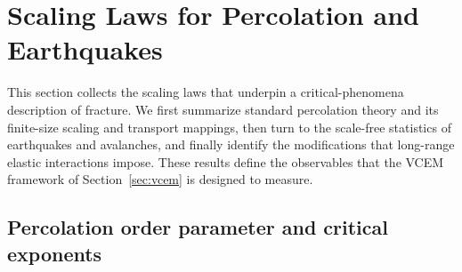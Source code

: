 \documentclass[preprint,12pt]{elsarticle}
\begin{document}
\section{Scaling Laws for Percolation and Earthquakes}
\label{sec:scaling}

This section collects the scaling laws that underpin a critical-phenomena
description of fracture. We first summarize standard percolation theory and its
finite-size scaling and transport mappings, then turn to the scale-free statistics of
earthquakes and avalanches, and finally identify the modifications that long-range
elastic interactions impose. These results define the observables that the VCEM
framework of Section~\ref{sec:vcem} is designed to measure.

\subsection{Percolation order parameter and critical exponents}
\label{sec:perc}
\end{document}
